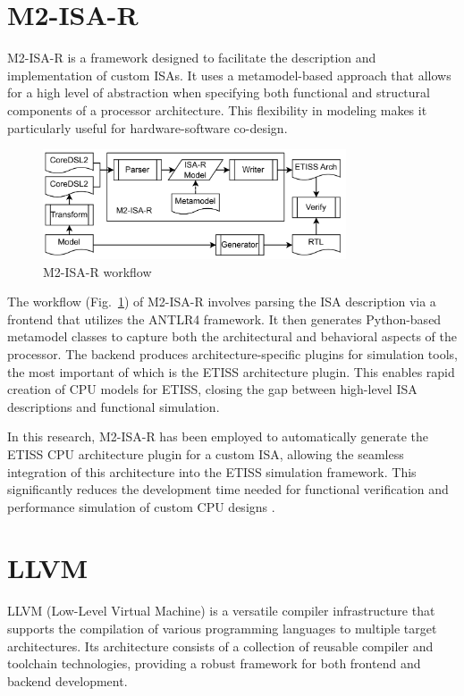 \section{M2-ISA-R}
M2-ISA-R is a framework designed to facilitate the description and implementation of custom ISAs. It uses a metamodel-based approach that allows for a high level of abstraction when specifying both functional and structural components of a processor architecture. This flexibility in modeling makes it particularly useful for hardware-software co-design.

\begin{figure}
    \centering
    \includegraphics[width=0.8\textwidth]{figures/m2isar.png}
    \caption{M2-ISA-R workflow \cite{RISCVSimulation}}
    \label{fig:m2isar}
\end{figure}

The workflow (Fig.~\ref{fig:m2isar}) of M2-ISA-R involves parsing the ISA description via a frontend that utilizes the ANTLR4 framework. It then generates Python-based metamodel classes to capture both the architectural and behavioral aspects of the processor. The backend produces architecture-specific plugins for simulation tools, the most important of which is the ETISS architecture plugin. This enables rapid creation of CPU models for ETISS, closing the gap between high-level ISA descriptions and functional simulation.

In this research, M2-ISA-R has been employed to automatically generate the ETISS CPU architecture plugin for a custom ISA, allowing the seamless integration of this architecture into the ETISS simulation framework. This significantly reduces the development time needed for functional verification and performance simulation of custom CPU designs \cite{RISCVSimulation}.

\section{LLVM}

LLVM (Low-Level Virtual Machine) is a versatile compiler infrastructure that supports the compilation of various programming languages to multiple target architectures. Its architecture consists of a collection of reusable compiler and toolchain technologies, providing a robust framework for both frontend and backend development.

